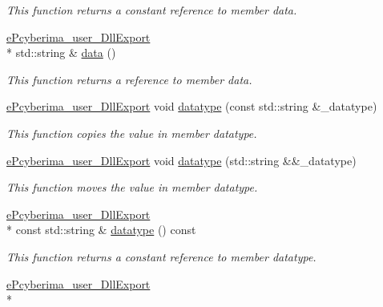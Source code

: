 \begin{DoxyCompactItemize}
\begin{DoxyCompactList}\small\item\em This function returns a constant reference to member data. \end{DoxyCompactList}\item 
\hyperlink{underlay__message_8h_a72796233f09f587d949ca1aa9842453d}{e\-Pcyberima\-\_\-user\-\_\-\-Dll\-Export} \\*
std\-::string \& \hyperlink{classapollo_1_1cyber_1_1transport_1_1UnderlayMessage_ac74e5c728e901bbd8377cc92db31ccc7}{data} ()
\begin{DoxyCompactList}\small\item\em This function returns a reference to member data. \end{DoxyCompactList}\item 
\hyperlink{underlay__message_8h_a72796233f09f587d949ca1aa9842453d}{e\-Pcyberima\-\_\-user\-\_\-\-Dll\-Export} void \hyperlink{classapollo_1_1cyber_1_1transport_1_1UnderlayMessage_aa4f52b71a88ffd62e82bef15ff7410e5}{datatype} (const std\-::string \&\-\_\-datatype)
\begin{DoxyCompactList}\small\item\em This function copies the value in member datatype. \end{DoxyCompactList}\item 
\hyperlink{underlay__message_8h_a72796233f09f587d949ca1aa9842453d}{e\-Pcyberima\-\_\-user\-\_\-\-Dll\-Export} void \hyperlink{classapollo_1_1cyber_1_1transport_1_1UnderlayMessage_a5f95225e4cfb18939d07711cd6d3a578}{datatype} (std\-::string \&\&\-\_\-datatype)
\begin{DoxyCompactList}\small\item\em This function moves the value in member datatype. \end{DoxyCompactList}\item 
\hyperlink{underlay__message_8h_a72796233f09f587d949ca1aa9842453d}{e\-Pcyberima\-\_\-user\-\_\-\-Dll\-Export} \\*
const std\-::string \& \hyperlink{classapollo_1_1cyber_1_1transport_1_1UnderlayMessage_ae218623fdf789454ee2ad39702a95be1}{datatype} () const 
\begin{DoxyCompactList}\small\item\em This function returns a constant reference to member datatype. \end{DoxyCompactList}\item 
\hyperlink{underlay__message_8h_a72796233f09f587d949ca1aa9842453d}{e\-Pcyberima\-\_\-user\-\_\-\-Dll\-Export} \\*

\end{DoxyCompactItemize}
